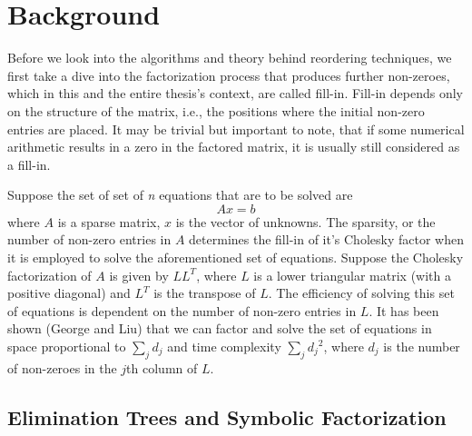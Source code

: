 \chapter{Background}
\label{ch:background}



Before we look into the algorithms and theory behind reordering techniques, we first take a dive into the factorization process that produces further non-zeroes, which in this and the entire thesis's context, are called fill-in. Fill-in depends only on the structure of the matrix, i.e., the positions where the initial non-zero entries are placed. It may be trivial but important to note, that if some numerical arithmetic results in a zero in the factored matrix, it is usually still considered as a fill-in. 

Suppose the set of set of \textit{n} equations that are to be solved are
\begin{equation}
    Ax = b
\end{equation}
where \(A\) is a sparse matrix, \(x\) is the vector of unknowns. The sparsity, or the number of non-zero entries in \(A\) determines the fill-in of it's Cholesky factor when it is employed to solve the aforementioned set of equations. 
Suppose the Cholesky factorization of \(A\) is given by \(LL^T\), where \(L\) is a lower triangular matrix (with a positive diagonal) and \(L^T\) is the transpose of \(L\). The efficiency of solving this set of equations is dependent on the number of non-zero entries in \(L\). It has been shown (George and Liu) that we can factor and solve the set of equations in space proportional to  \(\sum_j d_j\) and time complexity \(\sum_j {d_j}^2\), where \(d_j\) is the number of non-zeroes in the \(j\)th column of \(L\).


\section{Elimination Trees and Symbolic Factorization}
\label{sec:elim_tree}

